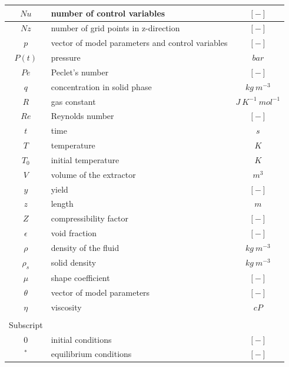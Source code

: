 \documentclass[a4paper,fleqn]{cas-dc}
\begin{document}
\begin{table}[p]
\begin{tabular}{ |c|l|c| }
			$Nu$		&	number of control variables				& $[-]$						\\ \hline
			$Nz$		&	number of grid points in z-direction	& $[-]$						\\ \hline
			$p$			&	vector of model parameters and control variables	& $[-]$			\\ \hline
			$P(t)$		&	pressure								& $bar$						\\ \hline
			$Pe$		&	Peclet's number							& $[-]$						\\ \hline
			$q$			&	concentration in solid phase			& $kg ~ m^{-3}$				\\ \hline
			$R$			&	gas constant							& $J ~ K^{-1} ~ mol^{-1}$	\\ \hline
			$Re$		&	Reynolds number							& $[-]$						\\ \hline
			$t$			&	time									& $s$						\\ \hline
			$T$			&	temperature								& $K$						\\ \hline
			$T_0$		&	initial temperature						& $K$						\\ \hline
			$V$			&	volume of the extractor					& $m^3$						\\ \hline
			$y$			&	yield	 								& $[-]$						\\ \hline
			$z$			&	length									& $m$						\\ \hline
			$Z$			&	compressibility	factor					& $[-]$						\\ \hline
			$\epsilon$	&	void fraction							& $[-]$						\\ \hline
			$\rho$		&	density of the fluid					& $kg ~ m^{-3}$				\\ \hline
			$\rho_s$	&	solid density							& $kg ~ m^{-3}$				\\ \hline
			$\mu$		&	shape coefficient						& $[-]$						\\ \hline
			$\theta$	&	vector of model parameters				& $[-]$						\\ \hline
			$\eta$		&	viscosity								& $cP$						\\ \hline				
						& 											&							\\ \hline			
		 	Subscript	& 											&							\\ \hline
			$0$			&	initial conditions						& $[-]$						\\ \hline
			$^*$		&	equilibrium conditions					& $[-]$						\\ \hline							
		\end{tabular}
\end{table}
\fi
\end{document}
